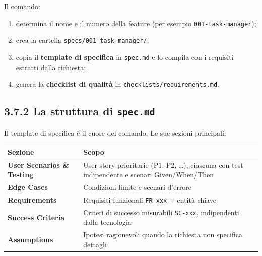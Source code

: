 \documentclass[
  italian,
  10pt,
]{book}
\newcounter{none} %
\providecommand{\tightlist}{%
  \setlength{\itemsep}{0pt}\setlength{\parskip}{0pt}}
\begin{document}
Il comando:

\begin{enumerate}
\def\labelenumi{\arabic{enumi}.}
\tightlist
\item
  determina il nome e il numero della feature (per esempio
  \texttt{001-task-manager});
\item
  crea la cartella \texttt{specs/001-task-manager/};
\item
  copia il \textbf{template di specifica} in \texttt{spec.md} e lo
  compila con i requisiti estratti dalla richiesta;
\item
  genera la \textbf{checklist di qualità} in
  \texttt{checklists/requirements.md}.
\end{enumerate}

\subsection{\texorpdfstring{3.7.2 La struttura di
\texttt{spec.md}}{3.7.2 La struttura di spec.md}}\label{la-struttura-di-spec.md}

Il template di specifica è il cuore del comando. Le sue sezioni
principali:

{\def\LTcaptype{none} %
\begin{longtable}[]{@{}
  >{\raggedright\arraybackslash}p{}
  >{\raggedright\arraybackslash}p{}@{}}
\toprule\noalign{}
\begin{minipage}[b]{\linewidth}\raggedright
Sezione
\end{minipage} & \begin{minipage}[b]{\linewidth}\raggedright
Scopo
\end{minipage} \\
\midrule\noalign{}
\endhead
\bottomrule\noalign{}
\endlastfoot
\textbf{User Scenarios \& Testing} & User story prioritarie (P1, P2,
\ldots), ciascuna con test indipendente e scenari Given/When/Then \\
\textbf{Edge Cases} & Condizioni limite e scenari d'errore \\
\textbf{Requirements} & Requisiti funzionali \texttt{FR-xxx} + entità
chiave \\
\textbf{Success Criteria} & Criteri di successo misurabili
\texttt{SC-xxx}, indipendenti dalla tecnologia \\
\textbf{Assumptions} & Ipotesi ragionevoli quando la richiesta non
specifica dettagli \\
\end{longtable}
}
\end{document}
